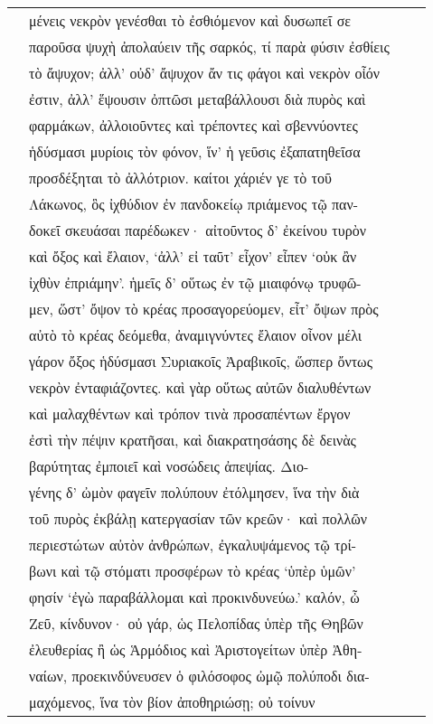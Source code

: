 \documentclass[a4paper,12pt]{article}
\begin{document}
\begin{center}
\begin{xtabular}{p{1cm}p{10.5454545454545cm}p{0.8cm}p{0cm}}
&μένεις νεκρὸν γενέσθαι τὸ ἐσθιόμενον καὶ δυσωπεῖ σε &&\\
&παροῦσα ψυχὴ ἀπολαύειν τῆς σαρκός, τί παρὰ φύσιν ἐσθίεις &&\\
&τὸ ἄψυχον; ἀλλ’ οὐδ’ ἄψυχον ἄν τις φάγοι καὶ νεκρὸν οἷόν &&\\
&ἐστιν, ἀλλ’ ἕψουσιν ὀπτῶσι μεταβάλλουσι διὰ πυρὸς καὶ &&\\
&φαρμάκων, ἀλλοιοῦντες καὶ τρέποντες καὶ σβεννύοντες &&\\
&ἡδύσμασι μυρίοις τὸν φόνον, ἵν’ ἡ γεῦσις ἐξαπατηθεῖσα &&\\
&προσδέξηται τὸ ἀλλότριον. καίτοι χάριέν γε τὸ τοῦ &&\\
&Λάκωνος, ὃς ἰχθύδιον ἐν πανδοκείῳ πριάμενος τῷ παν-&&\\
&δοκεῖ σκευάσαι παρέδωκεν· αἰτοῦντος δ’ ἐκείνου τυρὸν &&\\
&καὶ ὄξος καὶ ἔλαιον, ‘ἀλλ’ εἰ ταῦτ’ εἶχον’ εἶπεν ‘οὐκ ἂν &&\\
&ἰχθὺν ἐπριάμην’. ἡμεῖς δ’ οὕτως ἐν τῷ μιαιφόνῳ τρυφῶ-&&\\
&μεν, ὥστ’ ὄψον τὸ κρέας προσαγορεύομεν, εἶτ’ ὄψων πρὸς &&\\
&αὐτὸ τὸ κρέας δεόμεθα, ἀναμιγνύντες ἔλαιον οἶνον μέλι &&\\
&γάρον ὄξος ἡδύσμασι Συριακοῖς Ἀραβικοῖς, ὥσπερ ὄντως  &&\\
&νεκρὸν ἐνταφιάζοντες. καὶ γὰρ οὕτως αὐτῶν διαλυθέντων &&\\
&καὶ μαλαχθέντων καὶ τρόπον τινὰ προσαπέντων ἔργον &&\\
&ἐστὶ τὴν πέψιν κρατῆσαι, καὶ διακρατησάσης δὲ δεινὰς &&\\
&βαρύτητας ἐμποιεῖ καὶ νοσώδεις ἀπεψίας. Διο-&&\\
&γένης δ’ ὠμὸν φαγεῖν πολύπουν ἐτόλμησεν, ἵνα τὴν διὰ &&\\
&τοῦ πυρὸς ἐκβάλῃ κατεργασίαν τῶν κρεῶν· καὶ πολλῶν &&\\
&περιεστώτων αὐτὸν ἀνθρώπων, ἐγκαλυψάμενος τῷ τρί-&&\\
&βωνι καὶ τῷ στόματι προσφέρων τὸ κρέας ‘ὑπὲρ ὑμῶν’ &&\\
&φησίν ‘ἐγὼ παραβάλλομαι καὶ προκινδυνεύω.’ καλόν, ὦ &&\\
&Ζεῦ, κίνδυνον· οὐ γάρ, ὡς Πελοπίδας ὑπὲρ τῆς Θηβῶν &&\\
&ἐλευθερίας ἢ ὡς Ἁρμόδιος καὶ Ἀριστογείτων ὑπὲρ Ἀθη-&&\\
&ναίων, προεκινδύνευσεν ὁ φιλόσοφος ὠμῷ πολύποδι δια-&&\\
&μαχόμενος, ἵνα τὸν βίον ἀποθηριώσῃ; οὐ τοίνυν &&\\

\end{xtabular}
\end{center}
\end{document}

